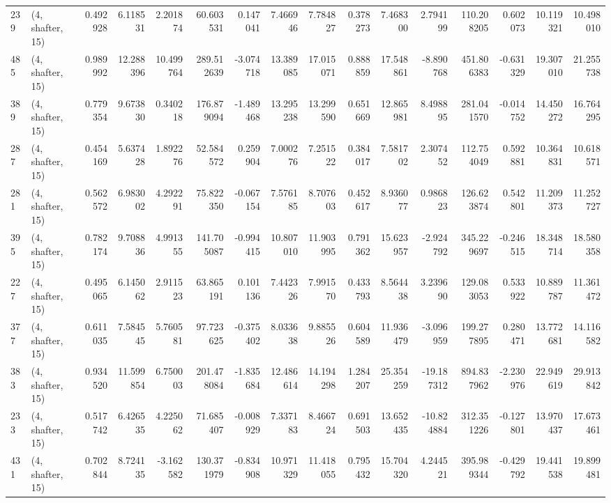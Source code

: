 \begin{tabular}{llrrrrrrrrrrrrrr}
239 &  (4, shafter, 15) &   0.492928 &   6.118531 &   2.201874 &    60.603531 &   0.147041 &   7.466946 &   7.784827 &  0.378273 &   7.468300 &   2.794199 &   110.208205 &  0.602073 &  10.119321 &  10.498010 \\
485 &  (4, shafter, 15) &   0.989992 &  12.288396 &  10.499764 &   289.512639 &  -3.074718 &  13.389085 &  17.015071 &  0.888859 &  17.548861 &  -8.890768 &   451.806383 & -0.631329 &  19.307010 &  21.255738 \\
389 &  (4, shafter, 15) &   0.779354 &   9.673830 &   0.340218 &   176.879094 &  -1.489468 &  13.295238 &  13.299590 &  0.651669 &  12.865981 &   8.498895 &   281.041570 & -0.014752 &  14.450272 &  16.764295 \\
287 &  (4, shafter, 15) &   0.454169 &   5.637428 &   1.892276 &    52.584572 &   0.259904 &   7.000276 &   7.251522 &  0.384017 &   7.581702 &   2.307452 &   112.754049 &  0.592881 &  10.364831 &  10.618571 \\
281 &  (4, shafter, 15) &   0.562572 &   6.983002 &   4.292291 &    75.822350 &  -0.067154 &   7.576185 &   8.707603 &  0.452617 &   8.936077 &   0.986823 &   126.623874 &  0.542801 &  11.209373 &  11.252727 \\
395 &  (4, shafter, 15) &   0.782174 &   9.708836 &   4.991355 &   141.705087 &  -0.994415 &  10.807010 &  11.903995 &  0.791362 &  15.623957 &  -2.924792 &   345.229697 & -0.246515 &  18.348714 &  18.580358 \\
227 &  (4, shafter, 15) &   0.495065 &   6.145062 &   2.911523 &    63.865191 &   0.101136 &   7.442326 &   7.991570 &  0.433793 &   8.564438 &   3.239690 &   129.083053 &  0.533922 &  10.889787 &  11.361472 \\
377 &  (4, shafter, 15) &   0.611035 &   7.584545 &   5.760581 &    97.723625 &  -0.375402 &   8.033638 &   9.885526 &  0.604589 &  11.936479 &  -3.096959 &   199.277895 &  0.280471 &  13.772681 &  14.116582 \\
383 &  (4, shafter, 15) &   0.934520 &  11.599854 &   6.750003 &   201.478084 &  -1.835684 &  12.486614 &  14.194298 &  1.284207 &  25.354259 & -19.187312 &   894.837962 & -2.230976 &  22.949619 &  29.913842 \\
233 &  (4, shafter, 15) &   0.517742 &   6.426535 &   4.225062 &    71.685407 &  -0.008929 &   7.337183 &   8.466724 &  0.691503 &  13.652435 & -10.824884 &   312.351226 & -0.127801 &  13.970437 &  17.673461 \\
431 &  (4, shafter, 15) &   0.702844 &   8.724135 &  -3.162582 &   130.371979 &  -0.834908 &  10.971329 &  11.418055 &  0.795432 &  15.704320 &   4.244521 &   395.989344 & -0.429792 &  19.441538 &  19.899481 \\

\end{tabular}
